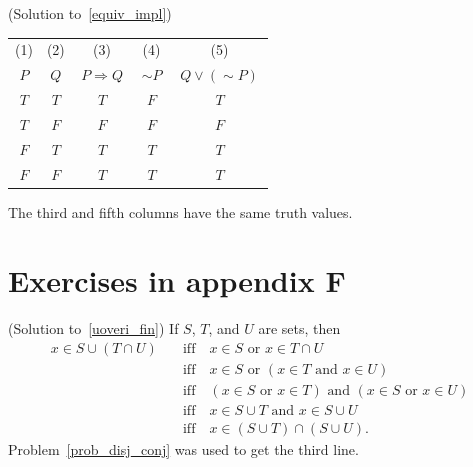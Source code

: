 \begin{prf}\label{sol_equiv_impl}(Solution to~\ref{equiv_impl})
 \begin{center}
  \begin{tabular}{|c|c||c|c|c|}\hline
           (1)     &     (2)       &        (3)               &    (4)        &      (5)                \\
        \,$P$\,    &    \,$Q$\,    &   \,$P \Rightarrow Q$\,  & \,$\sim P$\,  &  \,$Q \lor (\sim P)$\,  \\
    \hline\hline
          $T$      &      $T$      &     $T$                  &   $F$         &    $T$                  \\
    \hline
          $T$      &      $F$      &     $F$                  &   $F$         &    $F$                  \\
    \hline
          $F$      &      $T$      &     $T$                  &   $T$         &    $T$                  \\
    \hline
          $F$      &      $F$      &     $T$                  &   $T$         &    $T$                  \\
    \hline
  \end{tabular}
 \end{center}
The third and fifth columns have the same truth values.
\end{prf}
















\section{Exercises in appendix F}
 \nopagebreak
\begin{prf}\label{sol_uoveri_fin}(Solution to~\ref{uoveri_fin})
If $S$, $T$, and $U$ are sets, then
 \begin{align*}
    x \in S \cup (T \cap U) \quad
         &\text{iff} \quad x \in S \text{ or } x \in T \cap U \\
         &\text{iff} \quad x \in S  \text{ or }
                  (x \in T  \text{ and } x \in U) \\
         &\text{iff} \quad (x \in S \text{ or }  x \in T)
                  \text{ and } (x \in S \text{ or } x \in U) \\
         &\text{iff} \quad  x  \in  S \cup T
                  \text{ and } x  \in  S \cup U \\
         &\text{iff} \quad  x  \in  (S \cup T) \cap (S \cup U).
 \end{align*}
Problem~\ref{prob_disj_conj} was used to get the third line.
\end{prf}

